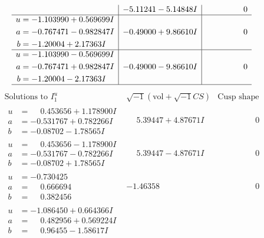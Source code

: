\documentclass[1p]{elsarticle_modified}
\theoremstyle{definition}
\newcommand{\I}{\sqrt{-1}}
\begin{document}
$$\begin{array}{c|c|c}
 & -5.11241 - 5.14848 I & \phantom{-0.000000 } 0 \\ \hline\begin{aligned}
u &= -1.103990 + 0.569699 I \\
a &= -0.767471 - 0.982847 I \\
b &= -1.20004 + 2.17363 I\end{aligned}
 & -0.49000 + 9.86610 I & \phantom{-0.000000 } 0 \\ \hline\begin{aligned}
u &= -1.103990 - 0.569699 I \\
a &= -0.767471 + 0.982847 I \\
b &= -1.20004 - 2.17363 I\end{aligned}
 & -0.49000 - 9.86610 I & \phantom{-0.000000 } 0\\
 \hline 
 \end{array}$$\newpage$$\begin{array}{c|c|c}  
\text{Solutions to }I^u_{1}& \I (\text{vol} + \sqrt{-1}CS) & \text{Cusp shape}\\
 \hline 
\begin{aligned}
u &= \phantom{-}0.453656 + 1.178900 I \\
a &= -0.531767 + 0.782266 I \\
b &= -0.08702 - 1.78565 I\end{aligned}
 & \phantom{-}5.39447 + 4.87671 I & \phantom{-0.000000 } 0 \\ \hline\begin{aligned}
u &= \phantom{-}0.453656 - 1.178900 I \\
a &= -0.531767 - 0.782266 I \\
b &= -0.08702 + 1.78565 I\end{aligned}
 & \phantom{-}5.39447 - 4.87671 I & \phantom{-0.000000 } 0 \\ \hline\begin{aligned}
u &= -0.730425\phantom{ +0.000000I} \\
a &= \phantom{-}0.666694\phantom{ +0.000000I} \\
b &= \phantom{-}0.382456\phantom{ +0.000000I}\end{aligned}
 & -1.46358\phantom{ +0.000000I} & \phantom{-0.000000 } 0 \\ \hline\begin{aligned}
u &= -1.086450 + 0.664366 I \\
a &= \phantom{-}0.482956 + 0.569224 I \\
b &= \phantom{-}0.96455 - 1.58617 I\end{aligned}

\end{array}$$
\end{document}
